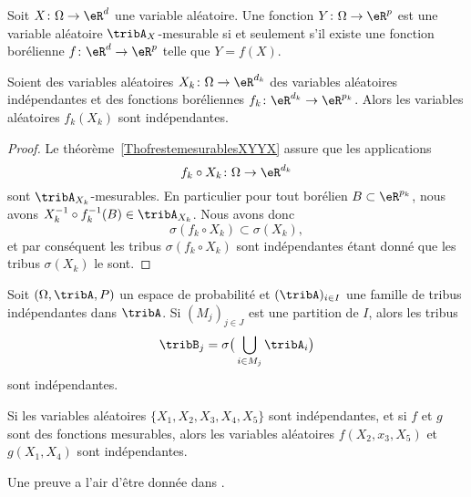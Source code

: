 \begin{theorem}     \label{ThofrestemesurablesXYYX}
    Soit \( X\colon \Omega\to \eR^d\) une variable aléatoire. Une fonction \( Y\colon \Omega\to \eR^{p}\) est une variable aléatoire \( \tribA_X\)-mesurable si et seulement s'il existe une fonction borélienne \( f\colon \eR^d\to \eR^{p}\) telle que \( Y=f(X)\).
\end{theorem}

\begin{proposition}
    Soient des variables aléatoires \( X_k\colon \Omega\to \eR^{d_k}\) des variables aléatoires indépendantes et des fonctions boréliennes \( f_k\colon \eR^{d_k}\to \eR^{p_k}\). Alors les variables aléatoires \( f_k(X_k)\) sont indépendantes.
\end{proposition}

\begin{proof}
    Le théorème~\ref{ThofrestemesurablesXYYX} assure que les applications
    \begin{equation}
        f_k\circ X_k\colon \Omega\to \eR^{d_k}
    \end{equation}
    sont \( \tribA_{X_k}\)-mesurables. En particulier pour tout borélien \( B\subset\eR^{p_k}\), nous avons \( X^{-1}_k\circ f^{-1}_k(B)\in\tribA_{X_k}\). Nous avons donc
    \begin{equation}
        \sigma(f_k\circ X_k)\subset\sigma(X_k),
    \end{equation}
    et par conséquent les tribus \( \sigma(f_k\circ X_k)\) sont indépendantes étant donné que les tribus \( \sigma(X_k)\) le sont.
\end{proof}

\begin{lemma}  \label{LemHOjqqw}
    Soit \( (\Omega,\tribA,P)\) un espace de probabilité et \( (\tribA)_{i\in I}\) une famille de tribus indépendantes dans \( \tribA\). Si \( (M_j)_{j\in J}\) est une partition de \( I\), alors les tribus
    \begin{equation}
        \tribB_j=\sigma\big( \bigcup_{i\in M_j}\tribA_i \big)
    \end{equation}
    sont indépendantes.

    Si les variables aléatoires \( \{ X_1,X_2,X_3,X_4,X_5 \}\) sont indépendantes, et si \( f\) et \( g\) sont des fonctions mesurables, alors les variables aléatoires \( f(X_2,x_3,X_5)\) et \( g(X_1,X_4)\) sont indépendantes.
\end{lemma}
Une preuve a l'air d'être donnée dans \cite{VincentBa}.

